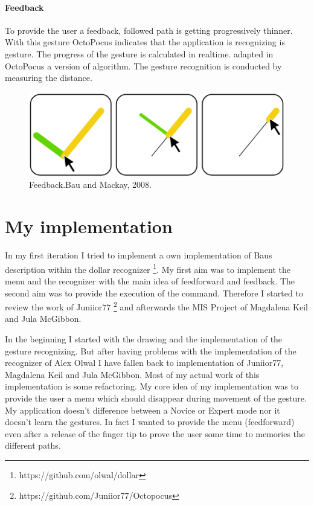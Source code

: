 \documentclass[11pt,twocolumn]{scrartcl}
\begin{document}
\paragraph{Feedback}
To provide the user a feedback, followed path is getting progressively thinner. With this gesture OctoPocus indicates that the application is recognizing is gesture. The progress of the gesture is calculated in realtime. \citeauthor{Bau2008} adapted in OctoPocus a version of \autocite{Rubine1991} algorithm. The gesture recognition is conducted by measuring the distance.
\begin{figure}[!h]
	\begin{center}
		\includegraphics[scale=0.5]{./img/feedback.png}
		\caption{Feedback.Bau and Mackay, 2008.}
	\end{center}
\end{figure}
\section{My implementation}
In my first iteration I tried to implement a own implementation of Baus description within the dollar recognizer \footnote{https://github.com/olwal/dollar}. My first aim was to implement the menu and the recognizer with the main idea of feedforward and feedback. The second aim was to provide the execution of the command. Therefore I started to review the work of Juniior77 \footnote{https://github.com/Juniior77/Octopocus} and afterwards the MIS Project of Magdalena Keil and Jula McGibbon. 

In the beginning I started with the drawing and the implementation of the gesture recognizing. But after having problems with the implementation of the recognizer of Alex Olwal I have fallen back to implementation of Juniior77, Magdalena Keil and Jula McGibbon. Most of my actual work of this implementation is some refactoring. My core idea of my implementation was to provide the user a menu which should disappear during movement of the gesture. My application doesn't difference between a Novice or Expert mode nor it doesn't learn the gestures. In fact I wanted to provide the menu (feedforward) even after a release of the finger tip to prove the user some time to memories the different paths. 
\end{document}
